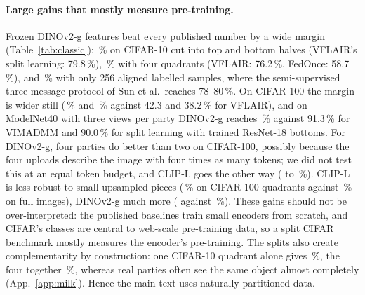\paragraph{Large gains that mostly measure pre-training.}
Frozen DINOv2-g features beat every published number by a wide margin (Table~\ref{tab:classic}): \cTenGTwo\,\% on CIFAR-10 cut into top and bottom halves (VFLAIR's split learning: 79.8\,\%), \cTenGFour\,\% with four quadrants (VFLAIR: 76.2\,\%, FedOnce: 58.7\,\%), and \sunA\,\% with only 256 aligned labelled samples, where the semi-supervised three-message protocol of Sun et al.\ reaches 78--80\,\%. On CIFAR-100 the margin is wider still (\cHunGTwo\,\% and \cHunGFour\,\% against 42.3 and 38.2\,\% for VFLAIR), and on ModelNet40 with three views per party DINOv2-g reaches \mnGFour\,\% against 91.3\,\% for VIMADMM and 90.0\,\% for split learning with trained ResNet-18 bottoms. For DINOv2-g, four parties do better than two on CIFAR-100, possibly because the four uploads describe the image with four times as many tokens; we did not test this at an equal token budget, and CLIP-L goes the other way (\cHunCTwo{} to \cHunCFour\,\%). CLIP-L is less robust to small upsampled pieces (\cHunCFour\,\% on CIFAR-100 quadrants against \cHunCCent\,\% on full images), DINOv2-g much more (\cHunGFour{} against \cHunGCent\,\%). These gains should not be over-interpreted: the published baselines train small encoders from scratch, and CIFAR's classes are central to web-scale pre-training data, so a split CIFAR benchmark mostly measures the encoder's pre-training. The splits also create complementarity by construction: one CIFAR-10 quadrant alone gives \cTenGSoloQ\,\%, the four together \cTenGFour\,\%, whereas real parties often see the same object almost completely (App.~\ref{app:milk}). Hence the main text uses naturally partitioned data.

